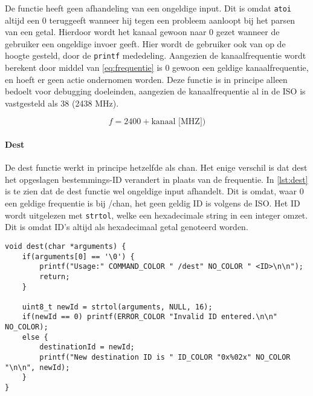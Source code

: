 De functie heeft geen afhandeling van een ongeldige input. Dit is omdat \texttt{atoi} altijd een 0 teruggeeft wanneer hij tegen een probleem aanloopt bij het parsen van een getal. Hierdoor wordt het kanaal gewoon naar 0 gezet wanneer de gebruiker een ongeldige invoer geeft. Hier wordt de gebruiker ook van op de hoogte gesteld, door de \texttt{printf} mededeling. Aangezien de kanaalfrequentie wordt berekent door middel van \autoref{eq:frequentie} is 0 gewoon een geldige kanaalfrequentie, en hoeft er geen actie ondernomen worden. Deze functie is in principe alleen bedoelt voor debugging doeleinden, aangezien de kanaalfrequentie al in de ISO is vastgesteld als 38 (2438 MHz).

\begin{equation} \label{eq:frequentie}
    f = 2400 + \textrm{kanaal [MHZ]})
\end{equation}

\paragraph*{Dest}
De dest functie werkt in principe hetzelfde als chan. Het enige verschil is dat dest het opgeslagen bestemmings-ID verandert in plaats van de frequentie. In \autoref{lst:dest} is te zien dat de dest functie wel ongeldige input afhandelt. Dit is omdat, waar 0 een geldige frequentie is bij /chan, het geen geldig ID is volgens de ISO. Het ID wordt uitgelezen met \texttt{strtol}, welke een hexadecimale string in een integer omzet. Dit is omdat ID's altijd als hexadecimaal getal genoteerd worden.

\begin{lstlisting}[caption={De dest functie},captionpos=b,label={lst:dest},style=c,xleftmargin=.\textwidth,xrightmargin=.\textwidth]
void dest(char *arguments) {
    if(arguments[0] == '\0') {
        printf("Usage:" COMMAND_COLOR " /dest" NO_COLOR " <ID>\n\n");
        return;
    }

    uint8_t newId = strtol(arguments, NULL, 16);
    if(newId == 0) printf(ERROR_COLOR "Invalid ID entered.\n\n" NO_COLOR);
    else {
        destinationId = newId;
        printf("New destination ID is " ID_COLOR "0x%02x" NO_COLOR "\n\n", newId);
    }
}
\end{lstlisting}


